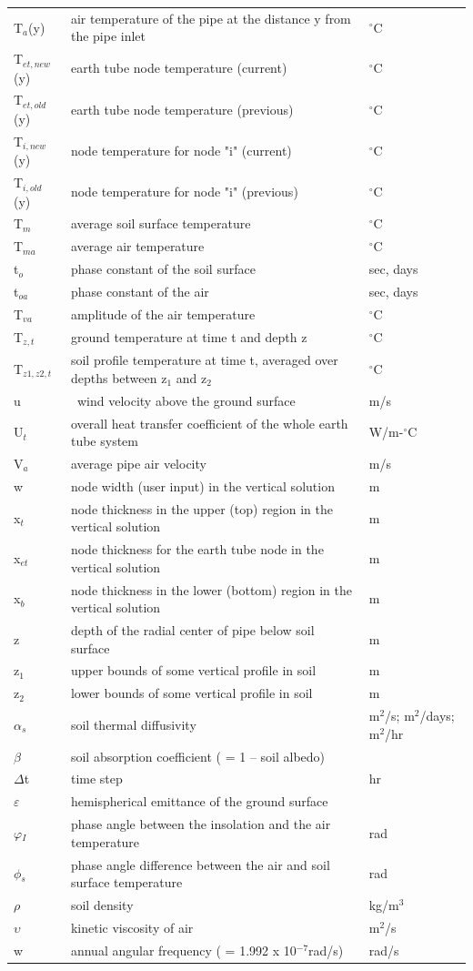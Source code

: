\begin{longtable}[c]{p{1.5in}p{3.0in}p{1.5in}}
T\(_{a}\)(y) & air temperature of the pipe at the distance y from the pipe inlet & \(^{\circ}\)C \tabularnewline
T\(_{et,new}\)(y) & earth tube node temperature (current) & \(^{\circ}\)C \tabularnewline
T\(_{et,old}\)(y) & earth tube node temperature (previous) & \(^{\circ}\)C \tabularnewline
T\(_{i,new}\)(y) & node temperature for node "i" (current) & \(^{\circ}\)C \tabularnewline
T\(_{i,old}\)(y) & node temperature for node "i" (previous) & \(^{\circ}\)C \tabularnewline
T\(_{m}\) & average soil surface temperature & \(^{\circ}\)C \tabularnewline
T\(_{ma}\) & average air temperature & \(^{\circ}\)C \tabularnewline
t\(_{o}\) & phase constant of the soil surface & sec, days \tabularnewline
t\(_{oa}\) & phase constant of the air & sec, days \tabularnewline
T\(_{va}\) & amplitude of the air temperature & \(^{\circ}\)C \tabularnewline
T\(_{z,t}\) & ground temperature at time t and depth z & \(^{\circ}\)C \tabularnewline
T\(_{z1,z2,t}\) & soil profile temperature at time t, averaged over depths between z\(_{1}\) and z\(_{2}\) & \(^{\circ}\)C \tabularnewline
u & ~wind velocity above the ground surface & m/s \tabularnewline
U\(_{t}\) & overall heat transfer coefficient of the whole earth tube system & W/m-\(^{\circ}\)C \tabularnewline
V\(_{a}\) & average pipe air velocity & m/s \tabularnewline
w & node width (user input) in the vertical solution & m \tabularnewline
x\(_{t}\) & node thickness in the upper (top) region in the vertical solution & m \tabularnewline
x\(_{et}\) & node thickness for the earth tube node in the vertical solution & m \tabularnewline
x\(_{b}\) & node thickness in the lower (bottom) region in the vertical solution & m \tabularnewline
z & depth of the radial center of pipe below soil surface & m \tabularnewline
z\(_{1}\) & upper bounds of some vertical profile in soil & m \tabularnewline
z\(_{2}\) & lower bounds of some vertical profile in soil & m \tabularnewline
$\alpha$\(_{s}\) & soil thermal diffusivity & m\(^{2}\)/s; m\(^{2}\)/days; m\(^{2}\)/hr \tabularnewline
$\beta$ & soil absorption coefficient ( = 1 – soil albedo) & ~ \tabularnewline
$\Delta$t & time step & hr \tabularnewline
$\varepsilon$ & hemispherical emittance of the ground surface & ~ \tabularnewline
$\varphi$\(_{I}\) & phase angle between the insolation and the air temperature & rad \tabularnewline
$\phi$\(_{s}\) & phase angle difference between the air and soil surface temperature & rad \tabularnewline
$\rho$ & soil density & kg/m\(^3\) \tabularnewline
$\upsilon$ & kinetic viscosity of air & m\(^{2}\)/s \tabularnewline
w & annual angular frequency ( = 1.992 x 10\(^{-7}\)rad/s) & rad/s \tabularnewline
\bottomrule
\end{longtable}


